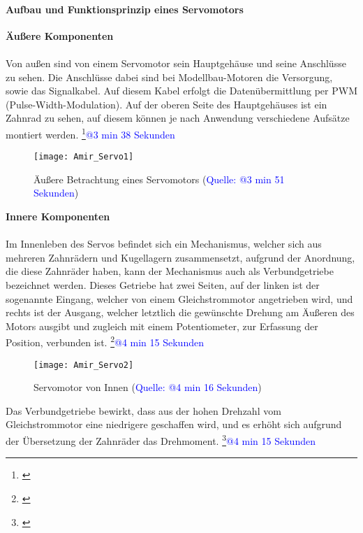 \documentclass[titlepage,12pt,twoside]{article}
\begin{document}
\paragraph{Aufbau und Funktionsprinzip eines Servomotors}
\label{par:Aufbau und Funktionsprinzip eines Servomotors}
\hfill \break
\hfill \break
\textbf{Äußere Komponenten} \\
\\
Von außen sind von einem Servomotor sein Hauptgehäuse und seine 
Anschlüsse zu sehen. Die Anschlüsse dabei sind bei Modellbau-Motoren 
die Versorgung, sowie das Signalkabel. Auf diesem Kabel erfolgt die 
Datenübermittlung per PWM (Pulse-Width-Modulation). Auf der oberen Seite 
des Hauptgehäuses ist ein Zahnrad zu sehen, auf diesem können je nach 
Anwendung verschiedene Aufsätze montiert werden. \footnote{\cite{Q1}}\textcolor{blue}{@3 min 38 Sekunden} \\
\begin{figure}[H]
	\begin{center}
		\scalebox{1.2}
		{\texttt{[image: Amir\_Servo1]}}
		\caption{Äußere Betrachtung eines Servomotors (\textcolor{blue}{Quelle: \cite{Q8}@3 min 51 Sekunden})}
		\label{fig:Amir_Servo1}
	\end{center}
\end{figure}
\hfill \break
\textbf{Innere Komponenten} \\
\\
Im Innenleben des Servos befindet sich ein Mechanismus, welcher sich aus 
mehreren Zahnrädern und Kugellagern zusammensetzt, aufgrund der 
Anordnung, die diese Zahnräder haben, kann der Mechanismus auch als 
Verbundgetriebe bezeichnet werden. Dieses Getriebe hat zwei Seiten, auf 
der linken ist der sogenannte Eingang, welcher von einem Gleichstrommotor 
angetrieben wird, und rechts ist der Ausgang, welcher letztlich die 
gewünschte Drehung am Äußeren des Motors ausgibt und zugleich mit einem 
Potentiometer, zur Erfassung der Position, verbunden ist. \footnote{\cite{Q8}}\textcolor{blue}{@4 min 15 Sekunden} \\
\begin{figure}[H]
	\begin{center}
		\scalebox{1.2}
		{\texttt{[image: Amir\_Servo2]}}
		\caption{Servomotor von Innen (\textcolor{blue}{Quelle: \cite{Q8}@4 min 16 Sekunden})}
		\label{fig:Amir_Servo2}
	\end{center}
\end{figure}
\hfill \break
Das Verbundgetriebe bewirkt, dass aus der hohen Drehzahl vom 
Gleichstrommotor eine niedrigere geschaffen wird, und es erhöht sich 
aufgrund der Übersetzung der Zahnräder das Drehmoment. \footnote{\cite{Q8}}\textcolor{blue}{@4 min 15 Sekunden} \\
\newpage
\end{document}
